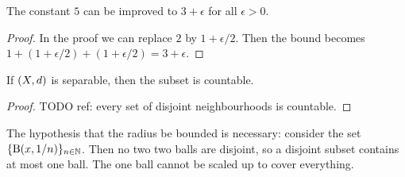 \begin{corollary}
The constant $5$ can be improved to $3+\epsilon$ for all $\epsilon >0$.
\end{corollary}
\begin{proof}
In the proof we can replace $2$ by $1+\epsilon/2$. Then the bound becomes $1+(1+\epsilon/2) + (1+\epsilon/2) = 3+\epsilon$.
\end{proof}
\begin{corollary}
If $\left( X,d \right)$ is separable, then the subset is countable.
\end{corollary}
\begin{proof}
TODO ref: every set of disjoint neighbourhoods is countable.
\end{proof}

\begin{example}
The hypothesis that the radius be bounded is necessary: consider the set $\{\operatorname{B}(x, 1/n)\}_{n\in \mathbb{N}}$. Then no two two balls are disjoint, so a disjoint subset contains at most one ball. The one ball cannot be scaled up to cover everything.
\end{example}
